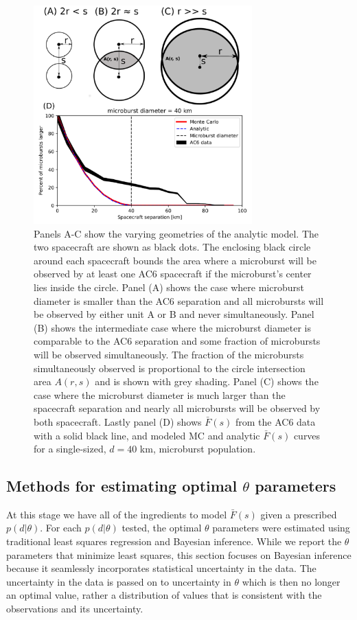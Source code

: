 \documentclass[draft]{agujournal2019}
\begin{document}
\begin{figure}
\includegraphics[width=0.75\textwidth]{fig5.pdf}
\caption{Panels A-C show the varying geometries of the analytic model. The two spacecraft are shown as black dots. The enclosing black circle around each spacecraft bounds the area where a microburst will be observed by at least one AC6 spacecraft if the microburst's center lies inside the circle. Panel (A) shows the case where microburst diameter is smaller than the AC6 separation and all microbursts will be observed by either unit A or B and never simultaneously. Panel (B) shows the intermediate case where the microburst diameter is comparable to the AC6 separation and some fraction of microbursts will be observed simultaneously. The fraction of the microbursts simultaneously observed is proportional to the circle intersection area $A(r, s)$ and is shown with grey shading. Panel (C) shows the case where the microburst diameter is much larger than the spacecraft separation and nearly all microbursts will be observed by both spacecraft. Lastly panel (D) shows $\bar{F}(s)$ from the AC6 data with a solid black line, and modeled MC and analytic $\bar{F}(s)$ curves for a single-sized, $d = 40$ km,  microburst population.} 
\label{fig5}
\end{figure}

\subsection{Methods for estimating optimal $\theta$ parameters}
At this stage we have all of the ingredients to model $\bar{F}(s)$ given a prescribed $p(d | \theta)$. For each $p(d | \theta)$ tested, the optimal $\theta$ parameters were estimated using traditional least squares regression and Bayesian inference. While we report the $\theta$ parameters that minimize least squares, this section focuses on Bayesian inference because it seamlessly incorporates statistical uncertainty in the data. The uncertainty in the data is passed on to uncertainty in $\theta$ which is then no longer an optimal value, rather a distribution of values that is consistent with the observations and its uncertainty. 
\end{document}

